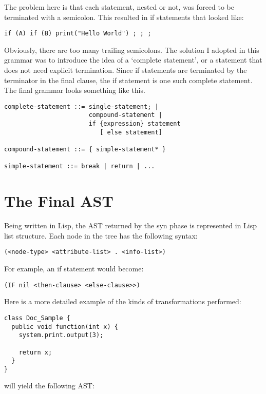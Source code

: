 \documentclass{article}[1994/05/24]
\begin{document}
The problem here is that each statement, nested or not, was forced
to be terminated with a semicolon.  This resulted in if statements
that looked like:

\begin{verbatim}
if (A) if (B) print("Hello World") ; ; ;
\end{verbatim}

	Obviously, there are too many trailing semicolons.  The
solution I adopted in this grammar was to introduce the idea of
a `complete statement', or a statement that does not need
explicit termination. Since if statements are terminated by the terminator
in the final clause, the if statement is one such complete statement.
The final grammar looks something like this.

\begin{verbatim}
complete-statement ::= single-statement; | 
                       compound-statement |
                       if {expression} statement 
                          [ else statement]

compound-statement ::= { simple-statement* }

simple-statement ::= break | return | ...
\end{verbatim}


\section{The Final AST}

	Being written in Lisp, the AST returned by the syn phase
is represented in Lisp list structure. Each node in the tree has
the following syntax:

\begin{verbatim}
(<node-type> <attribute-list> . <info-list>)
\end{verbatim}

For example, an if statement would become:

\begin{verbatim}
(IF nil <then-clause> <else-clause>>)
\end{verbatim}

Here is a more detailed example of the kinds of transformations 
performed:

\begin{verbatim}
class Doc_Sample {
  public void function(int x) {
    system.print.output(3);

    return x;
  }
}
\end{verbatim}

will yield the following AST:
\end{document}
